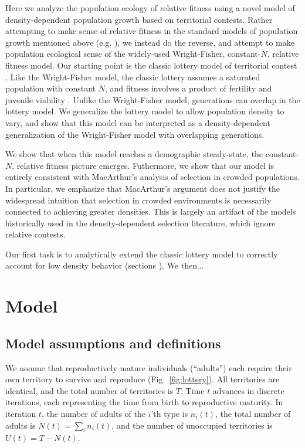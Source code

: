 \documentclass[11pt]{article}
\begin{document}
Here we analyze the population ecology of relative fitness using a novel model of density-dependent population growth based on territorial contests. Rather attempting to make sense of relative fitness in the standard models of population growth mentioned above (e.g. \cite{mallet_2012}), we instead do the reverse, and attempt to make population ecological sense of the widely-used Wright-Fisher, constant-$N$, relative fitness model. Our starting point is the classic lottery model of territorial contest \citep{sale_77,chesson_1981}. Like the Wright-Fisher model, the classic lottery assumes a saturated population with constant $N$, and fitness involves a product of fertility and juvenile viability \citep[pp. 185]{crow_1970}. Unlike the Wright-Fisher model, generations can overlap in the lottery model. We generalize the lottery model to allow population density to vary, and show that this model can be interpreted as a density-dependent generalization of the Wright-Fisher model with overlapping generations. 

We show that when this model reaches a demographic steady-state, the constant-$N$, relative fitness picture emerges. Futhermore, we show that our model is entirely consistent with MacArthur's analysis of selection in crowded populations. In particular, we emphasize that MacArthur's argument does not justify the widespread intuition that selection in crowded environments is necessarily connected to achieving greater densities. This is largely an artifact of the models historically used in the density-dependent selection literature, which ignore relative contests. 

Our first task is to analytically extend the classic lottery model to correctly account for low density behavior (sections ). We then...

 
\section*{Model}\label{sec:model}

\subsection*{Model assumptions and definitions} 

We assume that reproductively mature individuals (``adults'') each require their own territory to survive and reproduce (Fig.~\ref{fig:lottery}). All territories are identical, and the total number of territories is $T$. Time $t$ advances in discrete iterations, each representing the time from birth to reproductive maturity. In iteration $t$, the number of adults of the $i$'th type is $n_i(t)$, the total number of adults is $N(t)=\sum_i n_i(t)$, and the number of unoccupied territories is $U(t)=T-N(t)$. 
\end{document}
